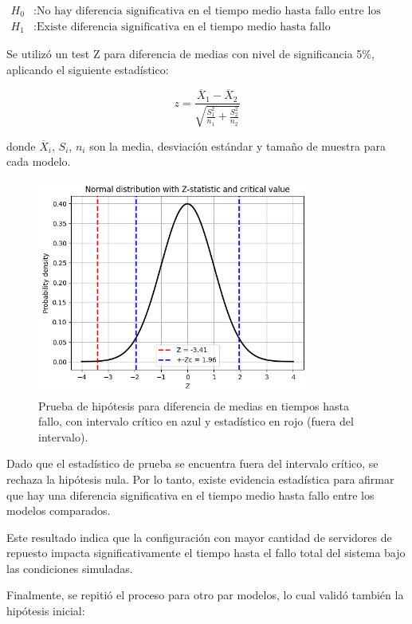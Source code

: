 \documentclass{article}
\begin{document}
\[
\begin{aligned}
H_0 &: \text{No hay diferencia significativa en el tiempo medio hasta fallo entre los modelos} \\
H_1 &: \text{Existe diferencia significativa en el tiempo medio hasta fallo}
\end{aligned}
\]

Se utilizó un test Z para diferencia de medias con nivel de significancia 5\%, aplicando el siguiente estadístico:

\[
z = \frac{\overline{X}_1 - \overline{X}_2}{\sqrt{\frac{S_1^2}{n_1} + \frac{S_2^2}{n_2}}}
\]

donde $\overline{X}_i$, $S_i$, $n_i$ son la media, desviación estándar y tamaño de muestra para cada modelo.

\begin{figure}[H]
   \centering
   \includegraphics[width=0.8\textwidth]{images/hypothesis_test.png}
   \caption{Prueba de hipótesis para diferencia de medias en tiempos hasta fallo, con intervalo crítico en azul y estadístico en rojo (fuera del intervalo).}
\end{figure}

Dado que el estadístico de prueba se encuentra fuera del intervalo crítico, se rechaza la hipótesis nula. Por lo tanto, existe evidencia estadística para afirmar que hay una diferencia significativa en el tiempo medio hasta fallo entre los modelos comparados.

Este resultado indica que la configuración con mayor cantidad de servidores de repuesto impacta significativamente el tiempo hasta el fallo total del sistema bajo las condiciones simuladas.



Finalmente, se repitió el proceso para otro par modelos, lo cual validó también la hipótesis inicial:
\end{document}
